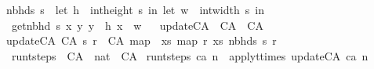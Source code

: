 \begin{isabellebody}
{\isachardoublequoteopen}nbhds\ s\ {\isacharequal}\ {\isacharparenleft}let\ h\ {\isacharequal}\ {\isacharparenleft}int{\isacharunderscore}height\ s{\isacharparenright}{\isacharminus}{}\ in\ {\isacharparenleft}let\ w\ {\isacharequal}\ {\isacharparenleft}int{\isacharunderscore}width\ s{\isacharparenright}{\isacharminus}{}\ in\isanewline
\ {\isacharbrackleft}{\isacharbrackleft}get{\isacharunderscore}nbhd\ s\ x\ y{\isachardot}\ y\ {\isasymleftarrow}\ {\isacharbrackleft}{}{\isachardot}{\isachardot}h{\isacharbrackright}{\isacharbrackright}{\isachardot}\ x\ {\isasymleftarrow}\ {\isacharbrackleft}{}{\isachardot}{\isachardot}w{\isacharbrackright}{\isacharbrackright}{\isacharparenright}{\isacharparenright}{\isachardoublequoteclose}\isanewline
\isanewline
\ \isanewline
{}\isamarkupfalse%
\ update{\isacharunderscore}CA\ {\isacharcolon}{\isacharcolon}\ {\isachardoublequoteopen}CA\ {\isasymRightarrow}\ CA{\isachardoublequoteclose}\ \isanewline
{\isachardoublequoteopen}update{\isacharunderscore}CA\ {\isacharparenleft}CA\ s\ r{\isacharparenright}\ {\isacharequal}\ CA\ {\isacharparenleft}map\ {\isacharparenleft}{\isasymlambda}\ xs{\isachardot}\ map\ r\ xs{\isacharparenright}\ {\isacharparenleft}nbhds\ s{\isacharparenright}{\isacharparenright}\ r{\isachardoublequoteclose}\isanewline
\isanewline
{}\isamarkupfalse%
\ run{\isacharunderscore}t{\isacharunderscore}steps\ {\isacharcolon}{\isacharcolon}\ {\isachardoublequoteopen}CA\ {\isasymRightarrow}\ nat\ {\isasymRightarrow}\ CA{\isachardoublequoteclose}\ \isanewline
{\isachardoublequoteopen}run{\isacharunderscore}t{\isacharunderscore}steps\ ca\ n\ {\isacharequal}\ apply{\isacharunderscore}t{\isacharunderscore}times\ update{\isacharunderscore}CA\ ca\ n{\isachardoublequoteclose}\isanewline
%
\isadelimtheory
%
\endisadelimtheory
%
\isatagtheory
{}\isamarkupfalse%
%
\endisatagtheory
{\isafoldtheory}%
%
\isadelimtheory
%
\endisadelimtheory
%
\end{isabellebody}%
\endinput
